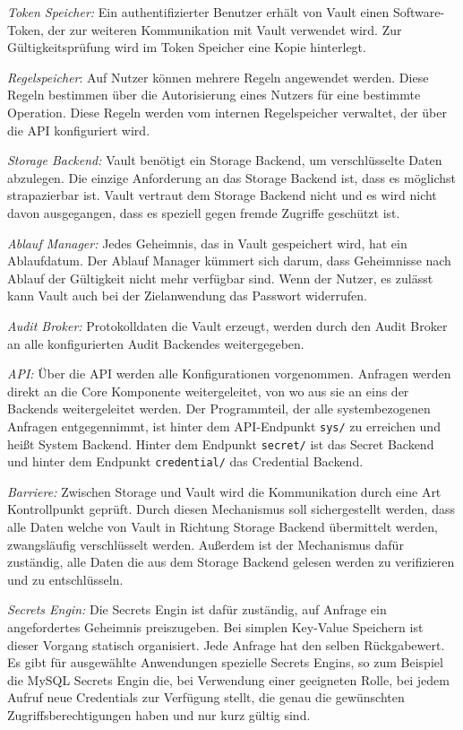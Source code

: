 \documentclass[
book,
a4paper,   
titlepage,  
halfparskip,
12pt        
]{scrartcl}
\newcommand\inline{\lstinline[basicstyle=\ttfamily]}
\begin{document}
\begin{onehalfspacing}
\textit{Token Speicher:} Ein authentifizierter Benutzer erhält von Vault einen Software-Token, der zur weiteren Kommunikation mit Vault verwendet wird. Zur Gültigkeitsprüfung wird im Token Speicher eine Kopie hinterlegt.

\textit{Regelspeicher}: Auf Nutzer können mehrere Regeln angewendet werden. Diese Regeln bestimmen über die Autorisierung eines Nutzers für eine bestimmte Operation. Diese Regeln werden vom internen Regelspeicher verwaltet, der über die \ac{API} konfiguriert wird.

\textit{Storage Backend:} Vault benötigt ein Storage Backend, um verschlüsselte Daten abzulegen. Die einzige Anforderung an das Storage Backend ist, dass es möglichst strapazierbar ist. Vault vertraut dem Storage Backend nicht und es wird nicht davon ausgegangen, dass es speziell gegen fremde Zugriffe geschützt ist.

\textit{Ablauf Manager:} Jedes Geheimnis, das in Vault gespeichert wird, hat ein Ablaufdatum. Der Ablauf Manager kümmert sich darum, dass Geheimnisse nach Ablauf der Gültigkeit nicht mehr verfügbar sind. Wenn der Nutzer, es zulässt kann Vault auch bei der Zielanwendung das Passwort widerrufen. 

\textit{Audit Broker:} Protokolldaten die Vault erzeugt, werden durch den Audit Broker an alle konfigurierten Audit Backendes weitergegeben.

\textit{\ac{API}:} Über die \ac{API} werden alle Konfigurationen vorgenommen. Anfragen werden direkt an die Core Komponente weitergeleitet, von wo aus sie an eins der Backends weitergeleitet werden.  Der Programmteil, der alle systembezogenen Anfragen entgegennimmt, ist hinter dem \ac{API}-Endpunkt \inline|sys/| zu erreichen und heißt System Backend. Hinter dem Endpunkt \inline|secret/| ist das Secret Backend und hinter dem Endpunkt \inline|credential/| das Credential Backend.

\textit{Barriere:} Zwischen Storage und Vault wird die Kommunikation durch eine Art Kontrollpunkt geprüft. Durch diesen Mechanismus soll sichergestellt werden, dass alle Daten welche von Vault in Richtung Storage Backend übermittelt werden, zwangsläufig verschlüsselt werden. Außerdem ist der Mechanismus dafür zuständig, alle Daten die aus dem Storage Backend gelesen werden zu verifizieren und zu entschlüsseln.

\textit{Secrets Engin:} Die Secrets Engin ist dafür zuständig, auf Anfrage ein angefordertes Geheimnis preiszugeben. Bei simplen Key-Value Speichern ist dieser Vorgang statisch organisiert. Jede Anfrage hat den selben Rückgabewert. Es gibt für ausgewählte Anwendungen spezielle Secrets Engins, so zum Beispiel die MySQL Secrets Engin die, bei Verwendung einer geeigneten Rolle, bei jedem Aufruf neue Credentials zur Verfügung stellt, die genau die gewünschten Zugriffsberechtigungen haben und nur kurz gültig sind.


\end{onehalfspacing}
\end{document}
